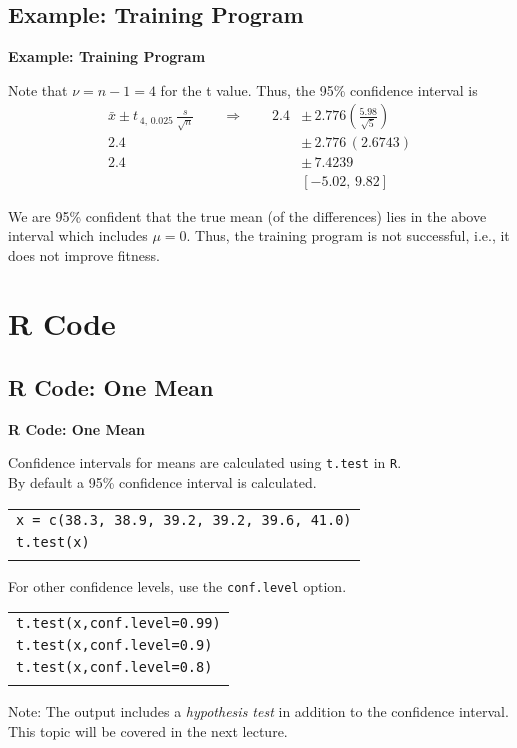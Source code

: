 \documentclass[compress]{beamer}        %
\makeatletter
\newcommand{\tcb}{\textcolor{beamer@blendedblue}}
\makeatother
\begin{document}
\subsection{Example: Training Program}
\begin{frame}{\bf \tcb{Example: Training Program}}

Note that $\nu = n - 1 = 4$ for the t value. Thus, the 95\% confidence interval is \\[-0.5cm]
\begin{align*}
\bar x \pm t_{\,4,\,0.025} \, \frac{s}{\sqrt{n}} \qquad \Rightarrow \qquad
2.4 &\pm  \, 2.776 \left(\frac{5.98}{\sqrt{5}}\right)\\[0.3cm]
2.4 &\pm  \, 2.776 \, ( 2.6743)\\[0.3cm]
2.4 &\pm  \, 7.4239\\[0.3cm]
&[-5.02,\,9.82]
\end{align*}

We are 95\% confident that the true mean (of the differences) lies in the above interval which includes $\mu = 0$. Thus, the training program is not successful, i.e., it does not improve fitness.

\end{frame}





\section{R Code\,\,}
\subsection{R Code: One Mean}
\begin{frame}{\bf \tcb{R Code: One Mean}}

Confidence intervals for means are calculated using \texttt{t.test} in \texttt{R}.\\[0.2cm]

By default a 95\% confidence interval is calculated.\\[0.2cm]
\begin{tabular}{|l|}
\hline
\texttt{x = c(38.3, 38.9, 39.2, 39.2, 39.6, 41.0)}\\[0.2cm]
\texttt{t.test(x)}\\
\hline
\multicolumn{1}{c}{}\\[0.2cm]
\end{tabular}

For other confidence levels, use the \texttt{conf.level} option.\\[0.2cm]
\begin{tabular}{|l|}
\hline
\texttt{t.test(x,conf.level=0.99)}\\
\texttt{t.test(x,conf.level=0.9)}\\
\texttt{t.test(x,conf.level=0.8)}\\
\hline
\multicolumn{1}{c}{}\\[0.2cm]
\end{tabular}

Note: The output includes a \emph{hypothesis test} in addition to the confidence interval. This topic will be covered in the next lecture.

\end{frame}
\end{document}
